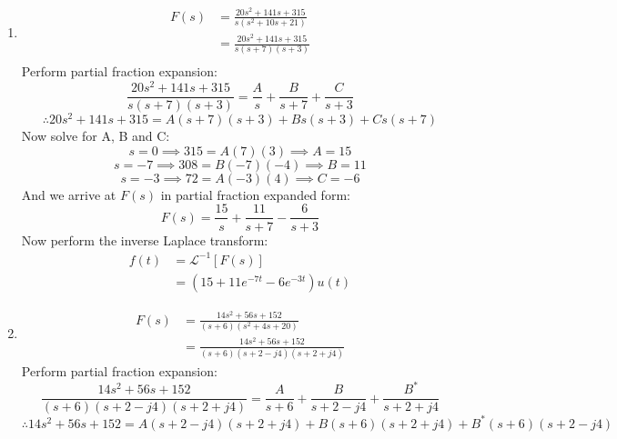 \begin{enumerate}
	\item{
		\begin{align*}
			F(s) &= \frac{20s^2+141s+315}{s \left(s^2+10s+21 \right)} \\
			&= \frac{20s^2+141s+315}{s(s+7)(s+3)} \\
		\end{align*}
		Perform partial fraction expansion:
		\begin{equation*}
			\frac{20s^2+141s+315}{s(s+7)(s+3)} = \frac{A}{s} + \frac{B}{s+7} + \frac{C}{s+3}
		\end{equation*}
		\begin{equation*}
			\therefore 20s^2+141s+315 = A(s+7)(s+3) + Bs(s+3) + Cs(s+7)
		\end{equation*}
		Now solve for A, B and C:
		\begin{equation*}
			s = 0 \implies 315 = A(7)(3) \implies A = 15
		\end{equation*}
		\begin{equation*}
			s = -7 \implies 308 = B(-7)(-4) \implies B = 11
		\end{equation*}
		\begin{equation*}
			s = -3 \implies 72 = A(-3)(4) \implies C = -6
		\end{equation*}
		And we arrive at $F(s)$ in partial fraction expanded form:
		\begin{equation*}
			F(s) = \frac{15}{s} + \frac{11}{s+7} - \frac{6}{s+3}
		\end{equation*}
		Now perform the inverse Laplace transform:
		\begin{align*}
			f(t) &= \mathcal{L}^{-1}[F(s)] \\
			&= \left(15 + 11e^{-7t} - 6e^{-3t} \right) u(t)
		\end{align*}
	}
	\item{
		\begin{align*}
			F(s) &= \frac{14s^2+56s+152}{(s+6) \left(s^2+4s+20 \right)} \\
			&= \frac{14s^2+56s+152}{(s+6)(s+2-j4)(s+2+j4)}
		\end{align*}
		Perform partial fraction expansion:
		\begin{equation*}
			\frac{14s^2+56s+152}{(s+6)(s+2-j4)(s+2+j4)} = \frac{A}{s+6} + \frac{B}{s+2-j4} + \frac{B^*}{s+2+j4}
		\end{equation*}
		\begin{equation*}
			\therefore 14s^2+56s+152 = A(s+2-j4)(s+2+j4) + B(s+6)(s+2+j4) + B^*(s+6)(s+2-j4)

\end{equation*}}
\end{enumerate}
